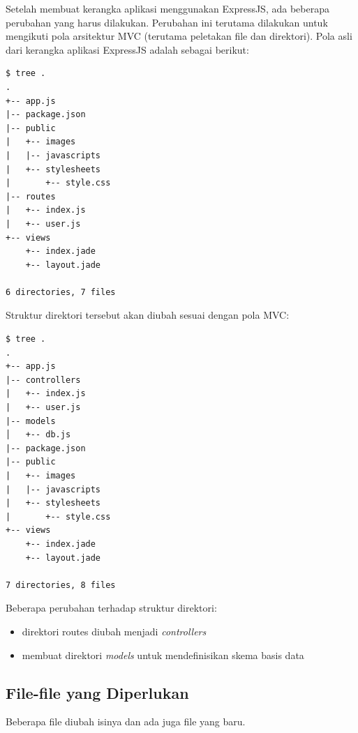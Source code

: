 Setelah membuat kerangka aplikasi menggunakan ExpressJS, ada beberapa perubahan yang harus dilakukan. Perubahan ini terutama dilakukan untuk mengikuti pola arsitektur MVC (terutama peletakan file dan direktori). Pola asli dari kerangka aplikasi ExpressJS adalah sebagai berikut:

\lstset{language=Bash,caption=Struktur direktori asli aplikasi ExpressJS}
\begin{lstlisting}
$ tree .
.
+-- app.js
|-- package.json
|-- public
|   +-- images
|   |-- javascripts
|   +-- stylesheets
|       +-- style.css
|-- routes
|   +-- index.js
|   +-- user.js
+-- views
    +-- index.jade
    +-- layout.jade

6 directories, 7 files
\end{lstlisting}

Struktur direktori tersebut akan diubah sesuai dengan pola MVC:

\lstset{language=Bash,caption=Struktur direktori ExpressJS sesuai pola MVC}
\begin{lstlisting}
$ tree .
.
+-- app.js
|-- controllers
|   +-- index.js
|   +-- user.js
|-- models
│   +-- db.js
|-- package.json
|-- public
|   +-- images
|   |-- javascripts
|   +-- stylesheets
|       +-- style.css
+-- views
    +-- index.jade
    +-- layout.jade

7 directories, 8 files
\end{lstlisting}

Beberapa perubahan terhadap struktur direktori:
\begin{itemize}
	\item direktori routes diubah menjadi \textit{controllers}
	\item membuat direktori \textit{models} untuk mendefinisikan skema basis data
\end{itemize}

\subsection{File-file yang Diperlukan}

Beberapa file diubah isinya dan ada juga file yang baru. 

